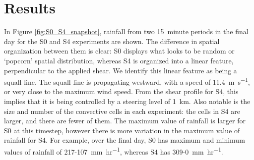 \documentclass[11pt,a4paper]{article}
\begin{document}
\newpage
\section{Results}

%

%
In Figure \ref{fig:S0_S4_snapshot}, rainfall from two \SI{15}{minute} periods in the final day for the S0 and S4 experiments are shown. The difference in spatial organization between them is clear: S0 displays what looks to be random or `popcorn' spatial distribution, whereas S4 is organized into a linear feature, perpendicular to the applied shear. We identify this linear feature as being a squall line. The squall line is propagating westward, with a speed of \SI{11.4}{m.s^{-1}}, or very close to the maximum wind speed. From the shear profile for S4, this implies that it is being controlled by a steering level of \SI{1}{km}. Also notable is the size and number of the convective cells in each experiment: the cells in S4 are larger, and there are fewer of them. The maximum value of rainfall is larger for S0 at this timestep, however there is more variation in the maximum value of rainfall for S4. For example, over the final day, S0 has maximum and minimum values of rainfall of \SI{217}{}-\SI{107}{mm.hr^{-1}}, whereas S4 has \SI{309}{}-\SI{0}{mm.hr^{-1}}.
\end{document}
